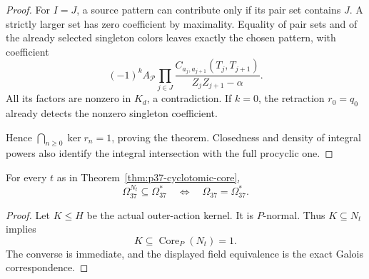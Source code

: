 \begin{proof}
For \(I=J\), a source pattern can contribute only if its
pair set contains \(J\). A strictly larger set has zero
coefficient by maximality. Equality of pair sets and of
the already selected singleton colors leaves exactly
the chosen pattern, with coefficient
\[
 (-1)^k A_{\mathcal P}
   \prod_{j\in J}
   \frac{C_{a_j,a_{j+1}}(T_j,T_{j+1})}
             {Z_jZ_{j+1}-\alpha}.
\]
All its factors are nonzero in \(K_d\), a contradiction.
If \(k=0\), the retraction \(r_0=q_0\) already detects the
nonzero singleton coefficient.

Hence \(\bigcap_{n\ge0}\ker r_n=1\), proving the theorem.
Closedness and density of integral powers also identify
the integral intersection with the full procyclic one.
\end{proof}

\begin{corollary}\label{cor:one-lift-p37-faithfulness}
For every \(t\) as in Theorem~\ref{thm:p37-cyclotomic-core},
\[
 \Omega_{37}^{N_t}\subseteq\Omega_{37}^*
 \quad\Longleftrightarrow\quad
 \Omega_{37}=\Omega_{37}^*.
\]
\end{corollary}

\begin{proof}
Let \(K\le H\) be the actual outer-action kernel.
It is \(P\)-normal. Thus \(K\subseteq N_t\) implies
\[
 K\subseteq\operatorname{Core}_P(N_t)=1.
\]
The converse is immediate, and the displayed field
equivalence is the exact Galois correspondence.
\end{proof}

